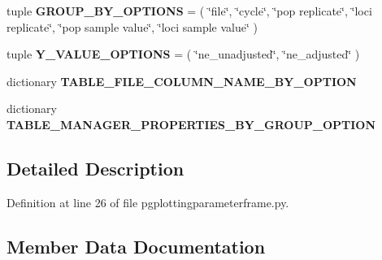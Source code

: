 \begin{DoxyCompactItemize}
\item 
tuple {\bfseries G\+R\+O\+U\+P\+\_\+\+B\+Y\+\_\+\+O\+P\+T\+I\+O\+NS} = ( \char`\"{}file\char`\"{}, \char`\"{}cycle\char`\"{}, \char`\"{}pop replicate\char`\"{}, \char`\"{}loci replicate\char`\"{}, \char`\"{}pop sample value\char`\"{}, \char`\"{}loci sample value\char`\"{} )\hypertarget{classnegui_1_1pgplottingparameterframe_1_1PGPlottingParameterFrameNeEstmations_acb71a23811224a98e781d8bc24ca0464}{}\label{classnegui_1_1pgplottingparameterframe_1_1PGPlottingParameterFrameNeEstmations_acb71a23811224a98e781d8bc24ca0464}

\item 
tuple {\bfseries Y\+\_\+\+V\+A\+L\+U\+E\+\_\+\+O\+P\+T\+I\+O\+NS} = ( \char`\"{}ne\+\_\+unadjusted\char`\"{}, \char`\"{}ne\+\_\+adjusted\char`\"{} )\hypertarget{classnegui_1_1pgplottingparameterframe_1_1PGPlottingParameterFrameNeEstmations_a6caa27edf24eb02548b75188528b0427}{}\label{classnegui_1_1pgplottingparameterframe_1_1PGPlottingParameterFrameNeEstmations_a6caa27edf24eb02548b75188528b0427}

\item 
dictionary {\bfseries T\+A\+B\+L\+E\+\_\+\+F\+I\+L\+E\+\_\+\+C\+O\+L\+U\+M\+N\+\_\+\+N\+A\+M\+E\+\_\+\+B\+Y\+\_\+\+O\+P\+T\+I\+ON}
\item 
dictionary {\bfseries T\+A\+B\+L\+E\+\_\+\+M\+A\+N\+A\+G\+E\+R\+\_\+\+P\+R\+O\+P\+E\+R\+T\+I\+E\+S\+\_\+\+B\+Y\+\_\+\+G\+R\+O\+U\+P\+\_\+\+O\+P\+T\+I\+ON}
\end{DoxyCompactItemize}


\subsection{Detailed Description}


Definition at line 26 of file pgplottingparameterframe.\+py.



\subsection{Member Data Documentation}
